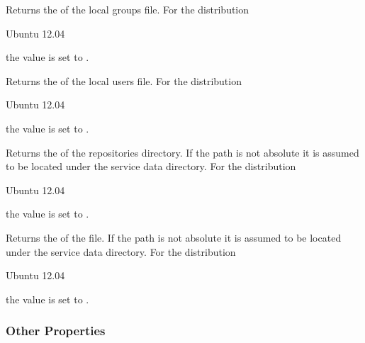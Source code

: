 
Returns the  of the local groups file.
For the distribution
\begin{inparaitem}
\item[\TheDistribution{ubuntu}] Ubuntu 12.04
\end{inparaitem}
the value is set to .


Returns the  of the local users file.
For the distribution
\begin{inparaitem}
\item[\TheDistribution{ubuntu}] Ubuntu 12.04
\end{inparaitem}
the value is set to .


Returns the  of the repositories directory. If the path is not
absolute it is assumed to be located under the service
data directory.
For the distribution
\begin{inparaitem}
\item[\TheDistribution{ubuntu}] Ubuntu 12.04
\end{inparaitem}
the value is set to .


Returns the  of the  file. If the path is not
absolute it is assumed to be located under the service
data directory.
For the distribution
\begin{inparaitem}
\item[\TheDistribution{ubuntu}] Ubuntu 12.04
\end{inparaitem}
the value is set to .

\subsubsection{Other Properties}

